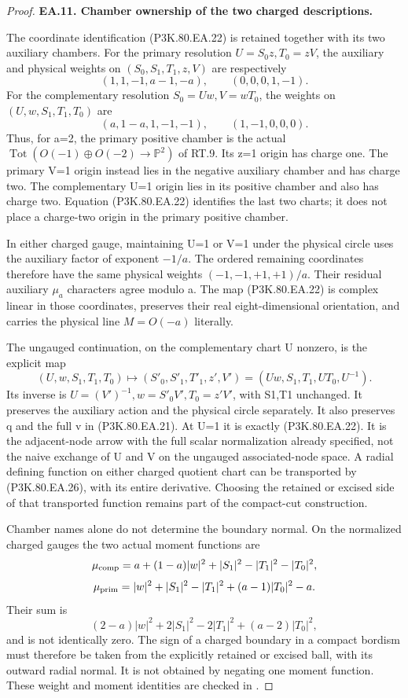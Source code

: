 \begin{proof}
\par\medskip\noindent\textbf{EA.11. Chamber ownership of the two charged descriptions.}\par\nopagebreak[4]

The coordinate identification (P3K.80.EA.22) is retained together with its two
auxiliary chambers. For the primary resolution
\(U=S_0z,T_0=zV\), the auxiliary and physical weights on
\((S_0,S_1,T_1,z,V)\) are respectively
\[
 (1,1,-1,a-1,-a),\qquad(0,0,0,1,-1).
\]
For the complementary resolution \(S_0=Uw,V=wT_0\), the weights
on \((U,w,S_1,T_1,T_0)\) are
\[
 (a,1-a,1,-1,-1),\qquad(1,-1,0,0,0).
\]
Thus, for a=2, the primary positive chamber is the actual
\(\operatorname{Tot}(O(-1)\oplus O(-2)\to\mathbb P^2)\)
of RT.9. Its z=1 origin has charge one. The primary V=1 origin
instead lies in the negative auxiliary chamber and has charge two.
The complementary U=1 origin lies in its positive chamber and also
has charge two. Equation (P3K.80.EA.22) identifies the last two charts;
it does not place a charge-two origin in the primary positive chamber.

In either charged gauge, maintaining U=1 or V=1 under the physical
circle uses the auxiliary factor of exponent \(-1/a\). The ordered
remaining coordinates therefore have the same physical weights
\((-1,-1,+1,+1)/a\). Their residual auxiliary \(\mu_a\)
characters agree modulo a. The map (P3K.80.EA.22) is complex linear in
those coordinates, preserves their real eight-dimensional orientation,
and carries the physical line \(M=O(-a)\) literally.

The ungauged continuation, on the complementary chart U nonzero,
is the explicit map
\[
 (U,w,S_1,T_1,T_0)\longmapsto
 (S'_0,S'_1,T'_1,z',V')=(Uw,S_1,T_1,UT_0,U^{-1}).
 \tag{P3K.80.EA.26}
\]
Its inverse is \(U=(V')^{-1},w=S'_0V',T_0=z'V'\), with
S1,T1 unchanged. It preserves the auxiliary action and the physical
circle separately. It also preserves q and the full v in (P3K.80.EA.21).
At U=1 it is exactly (P3K.80.EA.22). It is the adjacent-node arrow with
the full scalar normalization already specified, not the naive
exchange of U and V on the ungauged associated-node space. A
radial defining function on either charged quotient chart can be
transported by (P3K.80.EA.26), with its entire derivative. Choosing the
retained or excised side of that transported function remains part
of the compact-cut construction.

Chamber names alone do not determine the boundary normal. On the
normalized charged gauges the two actual moment functions are
\[
 \mu_{\rm comp}=a+(1-a)|w|^2+|S_1|^2-|T_1|^2-|T_0|^2,
\]
\[
 \mu_{\rm prim}=|w|^2+|S_1|^2-|T_1|^2
                         +(a-1)|T_0|^2-a.
\]
Their sum is
\[
 (2-a)|w|^2+2|S_1|^2-2|T_1|^2+(a-2)|T_0|^2,
\]
and is not identically zero. The sign of a charged boundary in a
compact bordism must therefore be taken from the explicitly retained
or excised ball, with its outward radial normal. It is not obtained
by negating one moment function. These weight and moment identities
are checked in .


\end{proof}
